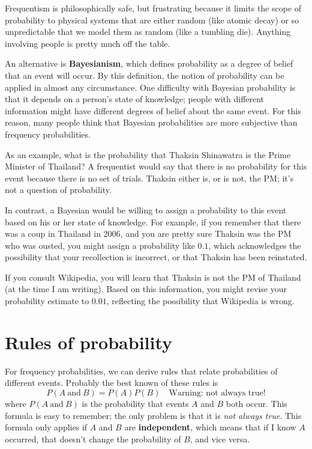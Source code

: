 \documentclass[12pt]{book}
\begin{document}

Frequentism is philosophically safe, but
frustrating because it limits the scope of probability to physical
systems that are either random (like atomic decay) or so unpredictable
that we model them as random (like a tumbling die).  Anything involving
people is pretty much off the table.

An alternative is {\bf Bayesianism}, which defines probability as
a degree of belief that an event will occur.  By this definition,
the notion of probability can be applied in almost any circumstance.
One difficulty with Bayesian probability is that it depends on
a person's state of knowledge; people with different information
might have different degrees of belief about the same event.  For
this reason, many people think that Bayesian probabilities are
more subjective than frequency probabilities.


As an example, what is the probability that Thaksin Shinawatra is the
Prime Minister of Thailand?  A frequentist would say that there is no
probability for this event because there is no set of
trials.  Thaksin either is, or is not, the PM; it's not a question of
probability.

In contrast, a Bayesian would be willing to assign a probability to
this event based on his or her state of knowledge.  For example, if
you remember that there was a coup in Thailand in 2006, and you are
pretty sure Thaksin was the PM who was ousted, you might
assign a probability like $0.1$, which acknowledges the possibility
that your recollection is incorrect, or that Thaksin has been
reinstated.

If you consult Wikipedia, you will learn that Thaksin is not the
PM of Thailand (at the time I am writing).  Based on this
information, you might revise your probability estimate to $0.01$,
reflecting the possibility that Wikipedia is wrong.


\section{Rules of probability}

\newcommand{\AND}{~\mbox{and}~}

For frequency probabilities, we can derive rules that relate
probabilities of different events.  Probably the best known of these
rules is
%
\[ P(A \AND B) = P(A) P(B) \quad \mbox{Warning: not always true!}\]
%
where $P(A \AND B)$ is the probability that events $A$ and $B$ both
occur.  This formula is easy to remember; the only problem is that it
is {\em not always true}.  This formula only applies if $A$ and $B$
are {\bf independent}, which means that if I know $A$ occurred, that
doesn't change the probability of $B$, and vice versa.
\end{document}
